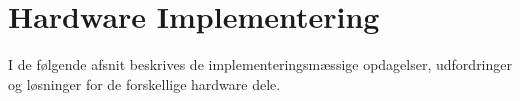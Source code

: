 \section{Hardware Implementering}

I de følgende afsnit beskrives de implementeringsmæssige opdagelser, udfordringer og løsninger for de forskellige hardware dele.




\clearpage